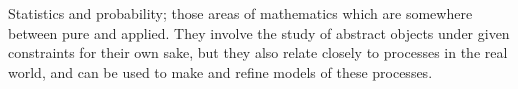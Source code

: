 Statistics and probability; those areas of mathematics which are somewhere
between pure and applied. They involve the study of abstract objects under
given constraints for their own sake, but they also relate closely to
processes in the real world, and can be used to make and refine models
of these processes.